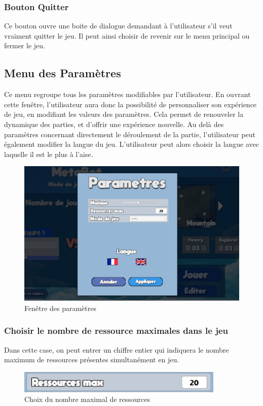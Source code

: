 \documentclass{report}
\begin{document}
\subsubsection{Bouton Quitter}
Ce bouton ouvre une boite de dialogue demandant à l'utilisateur s'il veut vraiment quitter le jeu. Il peut ainsi choisir de revenir sur le menu principal ou fermer le jeu.

\subsection{Menu des Paramètres}
Ce menu regroupe tous les paramètres modifiables par l'utilisateur. En ouvrant cette fenêtre, l'utilisateur aura donc la possibilité de personnaliser son expérience de jeu, en modifiant les valeurs des paramètres. Cela permet de renouveler la dynamique des parties, et d'offrir une expérience nouvelle. \newline
\smallbreak
Au delà des paramètres concernant directement le déroulement de la partie, l'utilisateur peut également modifier la langue du jeu. L'utilisateur peut alors choisir la langue avec laquelle il est le plus à l'aise.
\begin{figure}[h]
	\centering
		\includegraphics[scale=0.60]{MenuParametres}
	\caption{Fenêtre des paramètres}
\end{figure}

\subsubsection{Choisir le nombre de ressource maximales dans le jeu}
Dans cette case, on peut entrer un chiffre entier qui indiquera le nombre maximum de ressources présentes simultanément en jeu.
\begin{figure}[h]
	\centering
		\includegraphics[scale=0.80]{RessourcesMax}
	\caption{Choix du nombre maximal de ressources}
\end{figure}
\end{document}
